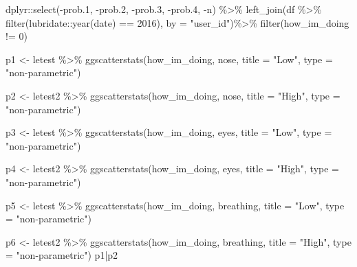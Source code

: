 \documentclass[
]{article}
\newenvironment{Shaded}{\begin{snugshade}}{\end{snugshade}}
\newcommand{\AttributeTok}[1]{\textcolor[rgb]{0.77,0.63,0.00}{#1}}
\newcommand{\DecValTok}[1]{\textcolor[rgb]{0.00,0.00,0.81}{#1}}
\newcommand{\FloatTok}[1]{\textcolor[rgb]{0.00,0.00,0.81}{#1}}
\newcommand{\FunctionTok}[1]{\textcolor[rgb]{0.00,0.00,0.00}{#1}}
\newcommand{\NormalTok}[1]{#1}
\newcommand{\OtherTok}[1]{\textcolor[rgb]{0.56,0.35,0.01}{#1}}
\newcommand{\SpecialCharTok}[1]{\textcolor[rgb]{0.00,0.00,0.00}{#1}}
\newcommand{\StringTok}[1]{\textcolor[rgb]{0.31,0.60,0.02}{#1}}
\begin{document}
\begin{Shaded}
\begin{Highlighting}[]
\NormalTok{  dplyr}\SpecialCharTok{::}\FunctionTok{select}\NormalTok{(}\SpecialCharTok{{-}}\NormalTok{prob}\FloatTok{.1}\NormalTok{,}
          \SpecialCharTok{{-}}\NormalTok{prob}\FloatTok{.2}\NormalTok{,}
          \SpecialCharTok{{-}}\NormalTok{prob}\FloatTok{.3}\NormalTok{,}
          \SpecialCharTok{{-}}\NormalTok{prob}\FloatTok{.4}\NormalTok{,}
          \SpecialCharTok{{-}}\NormalTok{n) }\SpecialCharTok{\%\textgreater{}\%} 
  \FunctionTok{left\_join}\NormalTok{(df }\SpecialCharTok{\%\textgreater{}\%}
  \FunctionTok{filter}\NormalTok{(lubridate}\SpecialCharTok{::}\FunctionTok{year}\NormalTok{(date) }\SpecialCharTok{==} \DecValTok{2016}\NormalTok{),}
         \AttributeTok{by =} \StringTok{"user\_id"}\NormalTok{)}\SpecialCharTok{\%\textgreater{}\%}
  \FunctionTok{filter}\NormalTok{(how\_im\_doing }\SpecialCharTok{!=} \DecValTok{0}\NormalTok{)}


\NormalTok{p1 }\OtherTok{\textless{}{-}}\NormalTok{ letest }\SpecialCharTok{\%\textgreater{}\%}
  \FunctionTok{ggscatterstats}\NormalTok{(how\_im\_doing, nose, }\AttributeTok{title =} \StringTok{"Low"}\NormalTok{, }\AttributeTok{type =} \StringTok{"non{-}parametric"}\NormalTok{)}


\NormalTok{p2 }\OtherTok{\textless{}{-}}\NormalTok{ letest2 }\SpecialCharTok{\%\textgreater{}\%}
  \FunctionTok{ggscatterstats}\NormalTok{(how\_im\_doing, nose, }\AttributeTok{title =} \StringTok{"High"}\NormalTok{, }\AttributeTok{type =} \StringTok{"non{-}parametric"}\NormalTok{)}

\NormalTok{p3 }\OtherTok{\textless{}{-}}\NormalTok{ letest }\SpecialCharTok{\%\textgreater{}\%}
  \FunctionTok{ggscatterstats}\NormalTok{(how\_im\_doing, eyes, }\AttributeTok{title =} \StringTok{"Low"}\NormalTok{, }\AttributeTok{type =} \StringTok{"non{-}parametric"}\NormalTok{)}


\NormalTok{p4 }\OtherTok{\textless{}{-}}\NormalTok{ letest2 }\SpecialCharTok{\%\textgreater{}\%}
  \FunctionTok{ggscatterstats}\NormalTok{(how\_im\_doing, eyes, }\AttributeTok{title =} \StringTok{"High"}\NormalTok{, }\AttributeTok{type =} \StringTok{"non{-}parametric"}\NormalTok{)}

\NormalTok{p5 }\OtherTok{\textless{}{-}}\NormalTok{ letest }\SpecialCharTok{\%\textgreater{}\%}
  \FunctionTok{ggscatterstats}\NormalTok{(how\_im\_doing, breathing, }\AttributeTok{title =} \StringTok{"Low"}\NormalTok{, }\AttributeTok{type =} \StringTok{"non{-}parametric"}\NormalTok{)}


\NormalTok{p6 }\OtherTok{\textless{}{-}}\NormalTok{ letest2 }\SpecialCharTok{\%\textgreater{}\%}
  \FunctionTok{ggscatterstats}\NormalTok{(how\_im\_doing, breathing, }\AttributeTok{title =} \StringTok{"High"}\NormalTok{, }\AttributeTok{type =} \StringTok{"non{-}parametric"}\NormalTok{)}
\NormalTok{p1}\SpecialCharTok{|}\NormalTok{p2}
\end{Highlighting}
\end{Shaded}
\end{document}
